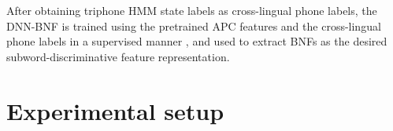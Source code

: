 \documentclass[a4paper]{article}
\begin{document}
After obtaining triphone HMM state labels  as cross-lingual phone labels, the DNN-BNF  is trained using the pretrained APC features and the cross-lingual phone labels in a supervised manner \cite{grezl2007probabilistic}, and used to  extract BNFs   as the desired subword-discriminative feature representation. 


\section{Experimental setup}
\end{document}
